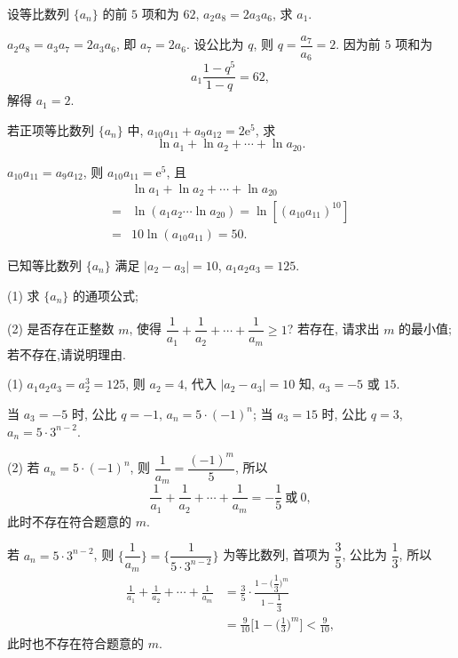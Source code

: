 \begin{exercise}
    设等比数列 $\{a_n\}$ 的前 $5$ 项和为 $62$, $a_2 a_8 =2a_3 a_6$, 求 $a_1$.
\end{exercise}
\beginsolution
    $a_2 a_8 =a_3 a_7= 2a_3 a_6$, 即 $a_7= 2a_6$. 设公比为 $q$, 则 $q= \dfrac{a_7}{a_6}= 2$. 因为前 $5$ 项和为
    \[a_1\frac{1- q^5}{1-q}= 62,\]
    解得 $a_1=2$.
\endsolution

\begin{exercise}
    若正项等比数列 $\{a_n\}$ 中, $a_{10} a_{11} + a_9 a_{12} = 2\mathrm{e}^5$, 求 
    \[\ln a_1 +\ln a_2 +\cdots+\ln a_{20}.\]
\end{exercise}
\beginsolution
    $a_{10} a_{11}= a_9 a_{12}$, 则 $a_{10} a_{11}= \mathrm{e}^5$, 且
    \[\begin{aligned}
        &\ln a_1 +\ln a_2 +\cdots+\ln a_{20}\\
        ={}& \ln (a_1 a_2 \cdots \ln a_{20})
            = \ln[(a_{10}a_{11})^{10}]\\
        ={}& 10\ln(a_{10}a_{11})
            = 50.
    \end{aligned}\]
\endsolution

\begin{exercise}
    已知等比数列 $\{a_n\}$ 满足 $|a_2-a_3|=10$, $a_1 a_2 a_3 =125$.
    
    (1) 求 $\{a_n\}$ 的通项公式;
    
    (2) 是否存在正整数 $m$, 使得 $\dfrac1{a_1}+\dfrac1{a_2}+\cdots +\dfrac1{a_m} \geqslant 1$? 若存在, 请求出 $m$ 的最小值; 若不存在,请说明理由.
\end{exercise}
\beginsolution
    (1) $a_1a_2a_3= a_2^3= 125$, 则 $a_2=4$, 代入 $|a_2-a_3|=10$ 知, $a_3= -5$ 或 $15$.

    当 $a_3= -5$ 时, 公比 $q= -1$, $a_n= 5\cdot(-1)^n$;
    当 $a_3= 15$ 时, 公比 $q= 3$, $a_n= 5\cdot 3^{n-2}$.

    (2) 若 $a_n= 5\cdot(-1)^n$, 则 $\dfrac1{a_m}= \dfrac{(-1)^m}5$, 所以
    \[\frac1{a_1}+\frac1{a_2}+\cdots +\frac1{a_m}
    = -\frac15\ \text{或}\ 0,\]
    此时不存在符合题意的 $m$.

    若 $a_n= 5\cdot 3^{n-2}$, 则 $\biggl\{\dfrac1{a_m}\biggr\}= \biggl\{\dfrac1{5\cdot 3^{n-2}}\biggr\}$ 为等比数列, 首项为 $\dfrac35$, 公比为 $\dfrac13$, 所以
    \[\begin{aligned}
        \frac1{a_1}+\frac1{a_2}+\cdots +\frac1{a_m}
        &= \frac35\cdot\frac{1-\biggl(\dfrac13\biggr)^m}{1-\dfrac13}\\
        &= \frac{9}{10}\biggl[1-\biggl(\frac13\biggr)^m\biggr]
        < \frac{9}{10},
    \end{aligned}\]
    此时也不存在符合题意的 $m$.
\endsolution

